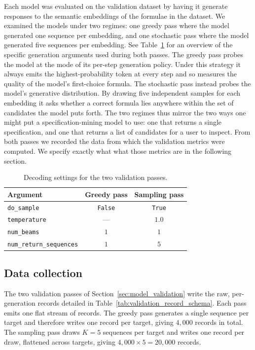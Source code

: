 \documentclass[titlepage,a4paper,11pt]{report}
\begin{document}
    Each model was evaluated on the validation dataset by having it generate responses to the semantic embeddings of the formulae in the dataset. We examined the models under two regimes: one greedy pass where the model generated one sequence per embedding, and one stochastic pass where the model generated five sequences per embedding. See Table~\ref{tab:validation_generation_settings} for an overview of the specific generation arguments used during both passes. The greedy pass probes the model at the mode of its per-step generation policy. Under this strategy it always emits the highest-probability token at every step and so measures the quality of the model's first-choice formula. The stochastic pass instead probes the model's generative distribution. By drawing five independent samples for each embedding it asks whether a correct formula lies anywhere within the set of candidates the model puts forth. The two regimes thus mirror the two ways one might put a specification-mining model to use: one that returns a single specification, and one that returns a list of candidates for a user to inspect. From both passes we recorded the data from which the validation metrics were computed. We specify exactly what what those metrics are in the following section. 
    
    \begin{table}[ht]
        \centering
        \caption{Decoding settings for the two validation passes.}
        \label{tab:validation_generation_settings}
        \begin{tabular}{lcc}
            \toprule
            Argument & Greedy pass & Sampling pass \\
            \midrule
            \texttt{do\_sample}             & \texttt{False}    & \texttt{True} \\
            \texttt{temperature}            & ---               & $1.0$ \\
            \texttt{num\_beams}             & $1$               & $1$ \\
            \texttt{num\_return\_sequences} & $1$               & $5$ \\
            \bottomrule
        \end{tabular}
    \end{table}
    
    \subsection{Data collection}\label{sec:data_collection}
    The two validation passes of Section~\ref{sec:model_validation} write the raw, per-generation records detailed in Table~\ref{tab:validation_record_schema}. Each pass emits one flat stream of records. The greedy pass generates a single sequence per target and therefore writes one record per target, giving $4{,}000$ records in total. The sampling pass draws $K = 5$ sequences per target and writes one record per draw, flattened across targets, giving $4{,}000 \times 5 = 20{,}000$ records.
\end{document}
